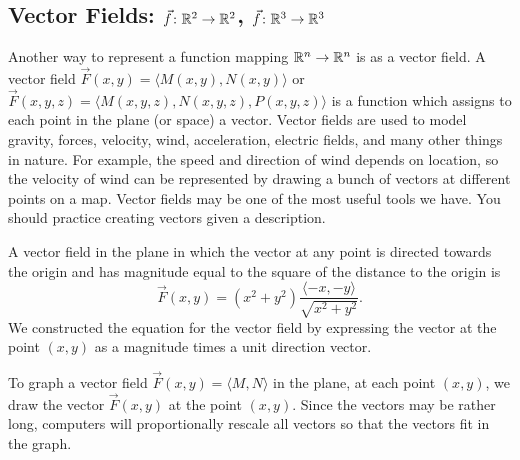 \subsection{Vector Fields: {$\vec f\colon \mathbb{R}^2\to \mathbb{R}^2$}, {$\vec f\colon \mathbb{R}^3\to \mathbb{R}^3$}}
Another way to represent a function mapping $\mathbb{R}^n\to\mathbb{R}^n$ is as a
vector field.  A vector field $\vec F(x,y) = \langle
M(x,y),N(x,y)\rangle$ or $\vec F(x,y,z) = \langle
M(x,y,z),N(x,y,z),P(x,y,z) \rangle$ is a function which assigns to
each point in the plane (or space) a vector.  Vector fields are used
to model gravity, forces, velocity, wind, acceleration, electric
fields, and many other things in nature. For example, the speed and
direction of wind depends on location, so the velocity of wind can be
represented by drawing a bunch of vectors at different points on a
map.  Vector fields may be one of the most useful tools we have.  You
should practice creating vectors given a description. 

\examplebegin A vector field in the plane in which the vector at any
point is directed towards the origin and has magnitude equal to the
square of the distance to the origin is
$$\vec F(x,y) =
(x^2+y^2)\frac{\langle-x,-y\rangle}{\sqrt{x^2+y^2}}.$$ We constructed
the equation for the vector field by expressing the vector at the
point $(x,y)$ as a magnitude times a unit direction vector.  \exampleend

To graph a vector field $\vec F(x,y) = \langle M,N\rangle$ in the
plane, at each point $(x,y)$, we draw the vector $\vec F(x,y)$ at the
point $(x,y)$. Since the vectors may be rather long, computers will
proportionally rescale all vectors so that the vectors fit in the
graph.

